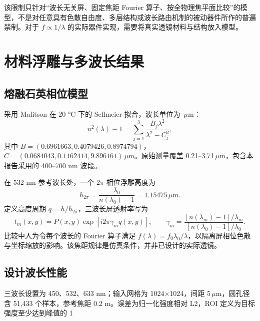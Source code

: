 \documentclass[UTF8,a4paper,11pt,fontset=fandol]{ctexart}
\newcommand{\um}{\,\mu\mathrm{m}}
\begin{document}
该限制只针对“波长无关屏、固定焦距 Fourier 算子、按全物理焦平面比较”的模型，不是对任意具有色散自由度、多层结构或波长路由机制的被动器件所作的普遍禁制。对于 $f\propto1/\lambda$ 的实际器件实现，需要将真实透镜材料与结构放入模型。

\section{材料浮雕与多波长结果}

\subsection{熔融石英相位模型}

采用 Malitson 在 20 °C 下的 Sellmeier 拟合，波长单位为 \ensuremath{\um}：
\begin{equation}
n^2(\lambda)-1=\sum_{j=1}^{3}\frac{B_j\lambda^2}{\lambda^2-C_j^2},
\end{equation}
其中 $B=(0.6961663,0.4079426,0.8974794)$，$C=(0.0684043,0.1162414,9.896161)$\ensuremath{\um}。原始测量覆盖 0.21--3.71\ensuremath{\um}，包含本报告采用的 400--700 nm 波段\cite{malitson}。

在 532 nm 参考波长处，一个 $2\pi$ 相位浮雕高度为
\begin{equation}
h_{2\pi}=\frac{\lambda_0}{n(\lambda_0)-1}=1.15475\um.
\end{equation}
定义高度周期 $q=h/h_{2\pi}$，三波长屏透射率写为
\begin{equation}
t_m(x,y)=P(x,y)\exp\!\left[i2\pi\gamma_mq(x,y)\right],\qquad
\gamma_m=\frac{[n(\lambda_m)-1]/\lambda_m}{[n(\lambda_0)-1]/\lambda_0}.
\end{equation}
比较中人为令每个波长的 Fourier 算子满足 $f(\lambda)=f_0\lambda_0/\lambda$，以隔离屏相位色散与坐标缩放的影响。该焦距规律是仿真条件，并非已设计的实际透镜。

\subsection{设计波长性能}

三波长设置为 450、532、633 nm；输入网格为 1024$\times$1024，间距 5\ensuremath{\um}，圆孔径含 51,433 个样本，参考焦距 0.2 m。误差为归一化强度相对 L2，ROI 定义为目标强度至少达到峰值的 1%
\end{document}
